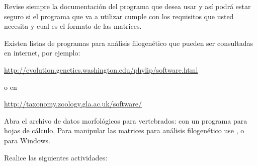 Revise siempre la documentaci\'on del programa que desea usar y as\'i podr\'a estar seguro si el programa que va a utilizar cumple con los requisitos que usted necesita y cual es el formato de las matrices.

Existen listas de programas para an\'alisis filogen\'etico que pueden ser consultadas en internet, por ejemplo:


\url{http://evolution.genetics.washington.edu/phylip/software.html}
 
o en 

\url{http://taxonomy.zoology.gla.ac.uk/software/}


Abra el archivo de datos morfol\'ogicos para vertebrados:  con un programa para hojas de c\'alculo. Para manipular las matrices para an\'alisis filogen\'etico use , 
 o  para Windows.

Realice las siguientes actividades:

